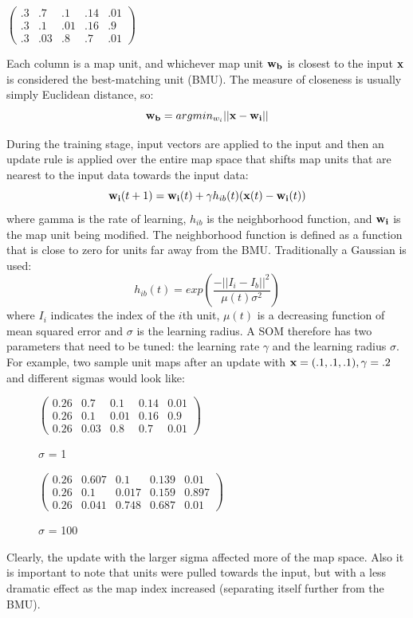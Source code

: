 \documentclass[a4paper,10pt]{article}
\begin{document}
\begin{center}
$
\begin{pmatrix}
.3 & .7 & .1  & .14 & .01\\
.3 & .1 & .01 & .16 & .9\\
.3 & .03 & .8 & .7  & .01
\end{pmatrix}
$
\end{center}
Each column is a map unit, and whichever map unit $\bold{w_b}$ is closest to the input $\bold{x}$
is considered the best-matching unit (BMU).  The measure of closeness is usually simply Euclidean
distance, so:
\begin{equation}
 \bold{w_b} = argmin_{w_i} ||\bold{x} - \bold{w_i}||
\end{equation}
 
During the training stage, input vectors are applied to the input and then an
update rule is applied over the entire map space that shifts map units that are nearest to the
input data towards the input data:
\begin{equation} \label{eq:UPDATE}
 \bold{w_{i}}(t+1) = \bold{w_i}(t) + \gamma h_{ib}(t)(\bold{x}(t)-\bold{w_i}(t))
\end{equation}
where gamma is the rate of learning, $h_{ib}$ is the neighborhood function, and $\bold{w_i}$ is the
map unit being modified.  The neighborhood function is defined as a function that is close to zero
for units far away from the BMU.  Traditionally a Gaussian is used:
\begin{equation} \label{eq:GAUSSIAN}
 h_{ib}(t) = exp(\frac{-||I_i-I_b||^2}{\mu(t)\sigma^2})
\end{equation}
where $I_i$ indicates the index of the $i$th unit, $\mu(t)$ is a decreasing function of mean
squared error and $\sigma$ is the learning radius.  A SOM therefore has two parameters that need to
be tuned: the learning rate $\gamma$ and the learning radius $\sigma$. For example, two sample unit
maps after an update with $\bold{x}=(.1,.1,.1), \gamma=.2$ and different sigmas would look like:
\begin{figure}[h]
\begin{center}
$
\begin{pmatrix}
0.26 &  0.7 &  0.1 &  0.14  & 0.01 \\
0.26  & 0.1  & 0.01 & 0.16 & 0.9  \\
0.26  & 0.03 & 0.8  & 0.7  & 0.01
\end{pmatrix}$
\caption{$\sigma$ = 1}
\centering
$\begin{pmatrix}
0.26 &  0.607 &  0.1 &  0.139  & 0.01 \\
0.26  & 0.1  & 0.017 & 0.159 & 0.897  \\
0.26  & 0.041 & 0.748  & 0.687  & 0.01
\end{pmatrix}
$
\caption{$\sigma$ = 100}
\end{center}
\end{figure}
Clearly, the update with the larger sigma affected more of the map space.  Also it is important to
note that units were pulled towards the input, but with a less dramatic effect as the map index
increased (separating itself further from the BMU).
\end{document}
